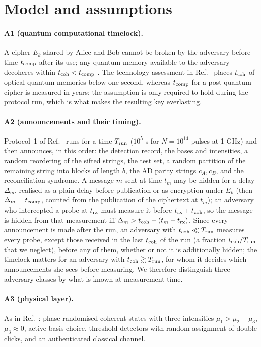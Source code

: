 \documentclass[aps,pra,twocolumn,superscriptaddress,nofootinbib]{revtex4-2}
\begin{document}
\section{Model and assumptions}
\paragraph*{A1 (quantum computational timelock).} A cipher $E_k$ shared by Alice and Bob cannot be broken by the adversary before time $t_{\rm comp}$ after its use; any quantum memory available to the adversary decoheres within $t_{\rm coh}<t_{\rm comp}$ \cite{VA20}. The technology assessment in Ref.~\cite{VA20} places $t_{\rm coh}$ of optical quantum memories below one second, whereas $t_{\rm comp}$ for a post-quantum cipher is measured in years; the assumption is only required to hold during the protocol run, which is what makes the resulting key everlasting.

\paragraph*{A2 (announcements and their timing).} Protocol~1 of Ref.~\cite{T25} runs for a time $T_{\rm run}$ ($10^5$ s for $N=10^{14}$ pulses at 1 GHz) and then announces, in this order: the detection record, the bases and intensities, a random reordering of the sifted strings, the test set, a random partition of the remaining string into blocks of length $b$, the AD parity strings $c_A,c_B$, and the reconciliation syndrome. A message $m$ sent at time $t_m$ may be hidden for a delay $\Delta_m$, realised as a plain delay before publication or as encryption under $E_k$ (then $\Delta_m=t_{\rm comp}$, counted from the publication of the ciphertext at $t_m$); an adversary who intercepted a probe at $t_{\rm rx}$ must measure it before $t_{\rm rx}+t_{\rm coh}$, so the message is hidden from that measurement iff $\Delta_m>t_{\rm coh}-(t_m-t_{\rm rx})$. Since every announcement is made after the run, an adversary with $t_{\rm coh}\ll T_{\rm run}$ measures every probe, except those received in the last $t_{\rm coh}$ of the run (a fraction $t_{\rm coh}/T_{\rm run}$ that we neglect), before any of them, whether or not it is additionally hidden; the timelock matters for an adversary with $t_{\rm coh}\gtrsim T_{\rm run}$, for whom it decides which announcements she sees before measuring. We therefore distinguish three adversary classes by what is known at measurement time.

\paragraph*{A3 (physical layer).} As in Ref.~\cite{T25}: phase-randomised coherent states with three intensities $\mu_1>\mu_2+\mu_3$, $\mu_3\approx0$, active basis choice, threshold detectors with random assignment of double clicks, and an authenticated classical channel.
\end{document}
